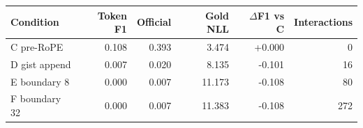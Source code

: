 \begin{tabular}{lrrrrr}
\toprule
Condition & Token F1 & Official & Gold NLL & $\Delta$F1 vs C & Interactions \\
\midrule
C pre-RoPE & 0.108 & 0.393 & 3.474 & +0.000 & 0 \\
D gist append & 0.007 & 0.020 & 8.135 & -0.101 & 16 \\
E boundary 8 & 0.000 & 0.007 & 11.173 & -0.108 & 80 \\
F boundary 32 & 0.000 & 0.007 & 11.383 & -0.108 & 272 \\
\bottomrule
\end{tabular}
